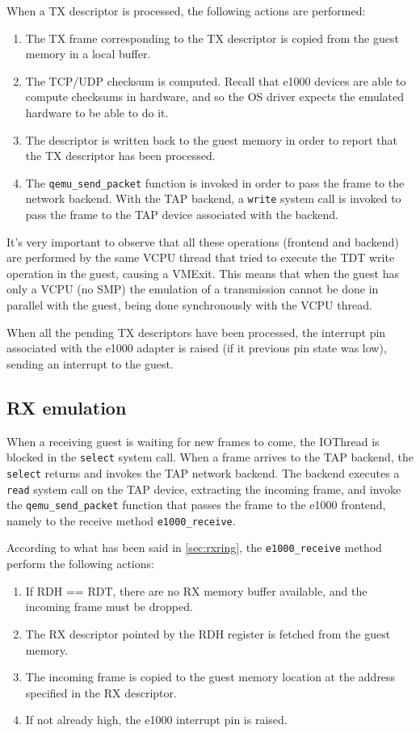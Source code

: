 When a TX descriptor is processed, the following actions are performed:
\begin{enumerate}
    \item The TX frame corresponding to the TX descriptor is copied from the guest memory in a local buffer.
    \item The TCP/UDP checksum is computed. Recall that e1000 devices are able to compute checksums in hardware, and so the OS 
	  driver expects the emulated hardware to be able to do it.
    \item The descriptor is written back to the guest memory in order to report that the TX descriptor has been processed.
    \item The \texttt{qemu\_send\_packet} function is invoked in order to pass the frame to the network backend. With the TAP backend,
	  a \texttt{write} system call is invoked to pass the frame to the TAP device associated with the backend.
\end{enumerate}

It's very important to observe that all these operations (frontend and backend) are performed by the same VCPU thread that tried to 
execute the TDT write operation in the guest, causing a VMExit.
This means that when the guest has only a VCPU (no SMP) the emulation of a transmission cannot be done in parallel with the guest, being
done synchronously with the VCPU thread.

\vspace{0.5cm}

When all the pending TX descriptors have been processed, the interrupt pin associated with the e1000 adapter is raised (if it previous
pin state was low), sending an interrupt to the guest.


\subsection{RX emulation}
When a receiving guest is waiting for new frames to come, the IOThread is blocked in the \texttt{select} system call.
When a frame arrives to the TAP backend, the \texttt{select} returns and invokes the TAP network backend.
The backend executes a \texttt{read} system call on the TAP device, extracting the incoming frame, and invoke the \texttt{qemu\_send\_packet}
function that passes the frame to the e1000 frontend, namely to the receive method \texttt{e1000\_receive}.

According to what has been said in \ref{sec:rxring}, the \texttt{e1000\_receive} method perform the following actions:
\begin{enumerate}
    \item If RDH == RDT, there are no RX memory buffer available, and the incoming frame must be dropped.
    \item The RX descriptor pointed by the RDH register is fetched from the guest memory.
    \item The incoming frame is copied to the guest memory location at the address specified in the RX descriptor.
    \item If not already high, the e1000 interrupt pin is raised.
\end{enumerate}

